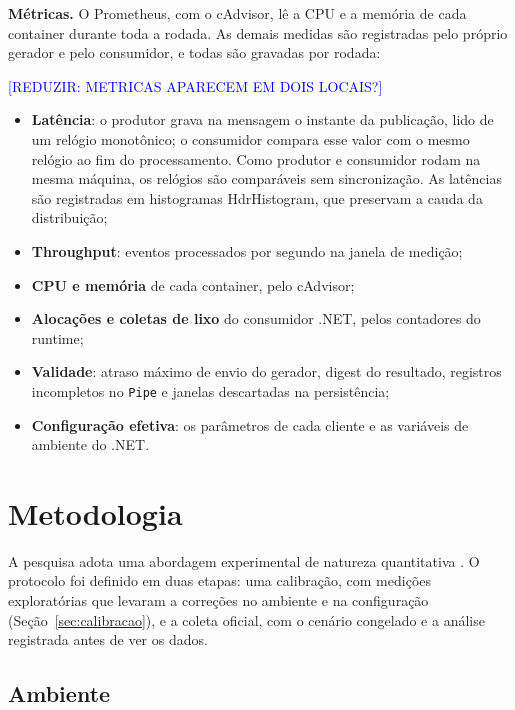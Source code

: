 \documentclass[12pt]{article}
\newcommand{\todoe}[1]{\textcolor{blue}{[#1]}}
\begin{document}
\textbf{Métricas.} O Prometheus, com o cAdvisor, lê a CPU e a memória de cada
container durante toda a rodada. As demais medidas são registradas pelo próprio
gerador e pelo consumidor, e todas são gravadas por rodada:

\todoe{REDUZIR: METRICAS APARECEM EM DOIS LOCAIS?}

\begin{itemize}
  \item \textbf{Latência}: o produtor grava na mensagem o instante da publicação,
        lido de um relógio monotônico; o consumidor compara esse valor com o mesmo
        relógio ao fim do processamento. Como produtor e consumidor rodam na mesma
        máquina, os relógios são comparáveis sem sincronização. As latências são
        registradas em histogramas HdrHistogram, que preservam a cauda da
        distribuição;
  \item \textbf{Throughput}: eventos processados por segundo na janela de medição;
  \item \textbf{CPU e memória} de cada container, pelo cAdvisor;
  \item \textbf{Alocações e coletas de lixo} do consumidor .NET, pelos contadores
        do runtime;
  \item \textbf{Validade}: atraso máximo de envio do gerador, digest do resultado,
        registros incompletos no \texttt{Pipe} e janelas descartadas na
        persistência;
  \item \textbf{Configuração efetiva}: os parâmetros de cada cliente e as
        variáveis de ambiente do .NET.
\end{itemize}


\section{Metodologia}
\label{sec:metodologia}

A pesquisa adota uma abordagem experimental de natureza quantitativa \cite{jain:1991}.
O protocolo foi definido em duas etapas: uma calibração, com medições exploratórias que
levaram a correções no ambiente e na configuração (Seção~\ref{sec:calibracao}), e a
coleta oficial, com o cenário congelado e a análise registrada antes de ver os dados.

\subsection{Ambiente}
\end{document}

